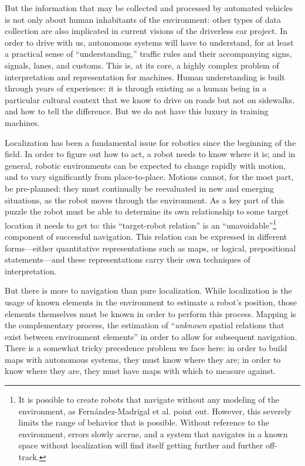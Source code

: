 But the information that may be collected and processed by automated
vehicles is not only about human inhabitants of the environment: other
types of data collection are also implicated in current
visions of the driverless car project. In order to drive with us,
autonomous systems will have to understand,
for at least a practical sense of ``understanding,'' traffic rules and
their accompanying signs, signals, lanes, and customs. This is, at its
core, a highly complex problem of interpretation and representation
for machines. Human understanding is built
through years of experience: it is through existing as a human being
in a particular cultural context that we know to drive on roads but
not on sidewalks, and how to tell the difference. But we do not have
this luxury in training machines.

Localization has been a fundamental issue for robotics since the
beginning of the field. In order to figure out how to act, a robot
needs to know where it is; and in general, robotic environments can be
expected to change rapidly with motion, and to vary significantly from
place-to-place\cite[p. 4]{SLAMbook}. Motions cannot, for the most part,
be pre-planned:  they must continually be reevaluated in new and
emerging situations, as the robot moves through the environment. As a
key part of this puzzle the robot must be able to determine its own
relationship to some target location it needs to get to: this
``target-robot relation'' is an ``unavoidable''\footnote{It is
  possible to create robots that navigate without any modeling of the
environment, as Fern\'{a}ndez-Madrigal et al. point out. However, this
severely limits the range of behavior that is possible. Without
reference to the environment, errors slowly accrue, and a system that
navigates in a known space without localization will find itself
getting further and further off-track.} component of successful
navigation.\cite[p. 5]{SLAMbook} This relation can be expressed
in different forms---either quantitative representations such as maps,
or logical, prepositional statements---and these representations carry
their own techniques of interpretation. 

But there is more to navigation than pure localization. While
localization is the usage of known elements in the environment to
estimate a robot's position, those elements themselves must be known
in order to perform this process. Mapping is the complementary
process, the estimation of ``\emph{unknown} spatial relations that
exist between environment elements'' in order to allow for subsequent
navigation\cite[p. 5]{SLAMbook}. There is a somewhat tricky
precedence problem we face here:  in order to build maps with
autonomous systems, they must know where they are; in order to know
where they are, they must have maps with which to measure
against.\cite[p. 6]{SLAMbook}

